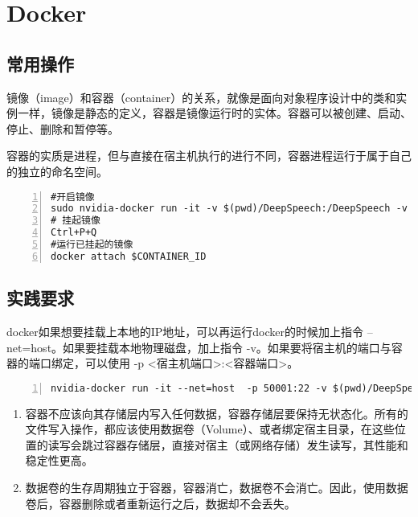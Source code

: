 \chapter{Docker}

\section{常用操作}
镜像（image）和容器（container）的关系，就像是面向对象程序设计中的类和实例一样，镜像是静态的定义，容器是镜像运行时的实体。容器可以被创建、启动、停止、删除和暂停等。

容器的实质是进程，但与直接在宿主机执行的进行不同，容器进程运行于属于自己的独立的命名空间。
\begin{lstlisting}[language = shell, numbers=left, 
         numberstyle=\tiny,keywordstyle=\color{blue!70},
         commentstyle=\color{red!50!green!50!blue!50},frame=shadowbox,
         rulesepcolor=\color{red!20!green!20!blue!20},basicstyle=\ttfamily]
#开启镜像
sudo nvidia-docker run -it -v $(pwd)/DeepSpeech:/DeepSpeech -v /data1/asr_data:/mnt/data -v //data/kaldi/2019_0521_kaldi/kaldi-master:/mnt/kaldi paddlepaddle/deep_speech:latest-gpu /bin/bash
# 挂起镜像
Ctrl+P+Q
#运行已挂起的镜像
docker attach $CONTAINER_ID
\end{lstlisting}

\section{实践要求}
docker如果想要挂载上本地的IP地址，可以再运行docker的时候加上指令 --net=host。如果要挂载本地物理磁盘，加上指令 -v。如果要将宿主机的端口与容器的端口绑定，可以使用 -p <宿主机端口>:<容器端口>。
\begin{lstlisting}[language = shell, numbers=left, 
         numberstyle=\tiny,keywordstyle=\color{blue!70},
         commentstyle=\color{red!50!green!50!blue!50},frame=shadowbox,
         rulesepcolor=\color{red!20!green!20!blue!20},basicstyle=\ttfamily]
nvidia-docker run -it --net=host  -p 50001:22 -v $(pwd)/DeepSpeech:/DeepSpeech  -v /data1/asr_data:/mnt/data -v /data/kaldi/2019_0521_kaldi/kaldi-master:/mnt/kaldi duhu/ds-server /bin/bash
\end{lstlisting}

\begin{enumerate}
  \item 容器不应该向其存储层内写入任何数据，容器存储层要保持无状态化。所有的文件写入操作，都应该使用数据卷（Volume）、或者绑定宿主目录，在这些位置的读写会跳过容器存储层，直接对宿主（或网络存储）发生读写，其性能和稳定性更高。
  \item 数据卷的生存周期独立于容器，容器消亡，数据卷不会消亡。因此，使用数据卷后，容器删除或者重新运行之后，数据却不会丢失。
\end{enumerate}

